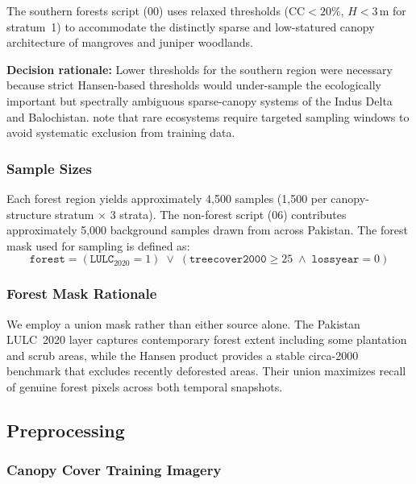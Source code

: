 \documentclass[12pt,a4paper,twoside]{article}
\newcommand{\CC}{\text{CC}}
\begin{document}
The southern forests script (00) uses relaxed thresholds ($\CC < 20\%$, $H < 3$\,m
for stratum~1) to accommodate the distinctly sparse and low-statured canopy
architecture of mangroves and juniper woodlands.

\textbf{Decision rationale:} Lower thresholds for the southern region were necessary
because strict Hansen-based thresholds would under-sample the ecologically important
but spectrally ambiguous sparse-canopy systems of the Indus Delta and Balochistan.
\citet{Roberts2017} note that rare ecosystems require targeted sampling windows to
avoid systematic exclusion from training data.

\subsubsection{Sample Sizes}

Each forest region yields approximately 4,500 samples (1,500 per canopy-structure
stratum $\times$ 3 strata).  The non-forest script (06) contributes approximately
5,000 background samples drawn from across Pakistan.  The forest mask used for
sampling is defined as:
\begin{equation}
  \texttt{forest} = (\texttt{LULC}_{2020} = 1) \;\lor\;
  (\texttt{treecover2000} \geq 25 \;\land\; \texttt{lossyear} = 0)
  \label{eq:forest_mask}
\end{equation}

\subsubsection{Forest Mask Rationale}

We employ a union mask rather than either source alone.  The Pakistan LULC~2020
layer captures contemporary forest extent including some plantation and scrub areas,
while the Hansen product provides a stable circa-2000 benchmark that excludes
recently deforested areas.  Their union maximizes recall of genuine forest pixels
across both temporal snapshots.

\subsection{Preprocessing}\label{sec:preprocessing}

\subsubsection{Canopy Cover Training Imagery}
\end{document}
